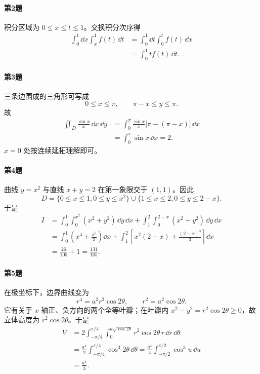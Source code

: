 \paragraph{第2题}
\begin{xsolution}
积分区域为 $0\le x\le t\le1$。交换积分次序得
\begin{align*}
  \int_0^1\dd x\int_x^1f(t)\,\dd t
  &=\int_0^1\dd t\int_0^t f(t)\,\dd x\\
  &=\int_0^1t f(t)\,\dd t.
\end{align*}
\end{xsolution}

\paragraph{第3题}
\begin{xsolution}
三条边围成的三角形可写成
\[
  0\le x\le\pi,\qquad \pi-x\le y\le\pi.
\]
故
\begin{align*}
  \iint_D\frac{\sin x}{x}\,\dd x\,\dd y
  &=\int_0^\pi\frac{\sin x}{x}\bigl[\pi-(\pi-x)\bigr]\,\dd x\\
  &=\int_0^\pi\sin x\,\dd x=\boxed{2}.
\end{align*}
$x=0$ 处按连续延拓理解即可。
\end{xsolution}

\paragraph{第4题}
\begin{xsolution}
曲线 $y=x^2$ 与直线 $x+y=2$ 在第一象限交于 $(1,1)$。因此
\[
  D=\{0\le x\le1,0\le y\le x^2\}
  \cup\{1\le x\le2,0\le y\le2-x\}.
\]
于是
\begin{align*}
 I&=\int_0^1\int_0^{x^2}(x^2+y^2)\,\dd y\,\dd x
 +\int_1^2\int_0^{2-x}(x^2+y^2)\,\dd y\,\dd x\\
 &=\int_0^1\left(x^4+\frac{x^6}{3}\right)\dd x
 +\int_1^2\left[x^2(2-x)+\frac{(2-x)^3}{3}\right]\dd x\\
 &=\frac{26}{105}+1=\boxed{\frac{131}{105}}.
\end{align*}
\end{xsolution}

\paragraph{第5题}
\begin{xsolution}
在极坐标下，边界曲线变为
\[
  r^4=a^2r^2\cos2\theta,
  \qquad r^2=a^2\cos2\theta.
\]
它有关于 $x$ 轴正、负方向的两个全等叶瓣；在叶瓣内 $x^2-y^2=r^2\cos2\theta\ge0$，故立体高度为 $r^2\cos2\theta$。于是
\begin{align*}
 V&=2\int_{-\pi/4}^{\pi/4}\int_0^{a\sqrt{\cos2\theta}}
 r^2\cos2\theta\,r\,\dd r\,\dd\theta\\
 &=\frac{a^4}{2}\int_{-\pi/4}^{\pi/4}\cos^3 2\theta\,\dd\theta
 =\frac{a^4}{4}\int_{-\pi/2}^{\pi/2}\cos^3u\,\dd u\\
 &=\boxed{\frac{a^4}{3}}.
\end{align*}
\end{xsolution}

